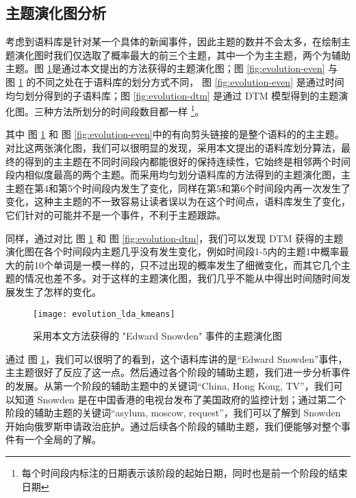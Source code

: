 \subsection{主题演化图分析}
\label{sec:evolution-map}
考虑到语料库是针对某一个具体的新闻事件，因此主题的数并不会太多，在绘制主题演化图时我们仅选取了概率最大的前三个主题，其中一个为主主题，两个为辅助主题。图 \ref{fig:evolution-our}是通过本文提出的方法获得的主题演化图；图 \ref{fig:evolution-even} 与 图 \ref{fig:evolution-our} 的不同之处在于语料库的划分方式不同， 图 \ref{fig:evolution-even}  是通过时间均匀划分得到的子语料库；图 \ref{fig:evolution-dtm} 是通过 DTM 模型得到的主题演化图。三种方法所划分的时间段数目都一样 \footnote{每个时间段内标注的日期表示该阶段的起始日期，同时也是前一个阶段的结束日期}。

其中 图 \ref{fig:evolution-our} 和 图 \ref{fig:evolution-even}中的有向剪头链接的是整个语料的的主主题。对比这两张演化图，我们可以很明显的发现，采用本文提出的语料库划分算法，最终的得到的主主题在不同时间段内都能很好的保持连续性，它始终是相邻两个时间段内相似度最高的两个主题。而采用均匀划分语料库的方法得到的主题演化图，主主题在第4和第5个时间段内发生了变化，同样在第5和第6个时间段内再一次发生了变化，这种主主题的不一致容易让读者误以为在这个时间点，语料库发生了变化，它们针对的可能并不是一个事件，不利于主题跟踪。

同样，通过对比 图 \ref{fig:evolution-our} 和 图 \ref{fig:evolution-dtm}，我们可以发现 DTM 获得的主题演化图在各个时间段内主题几乎没有发生变化，例如时间段1-5内的主题1中概率最大的前10个单词是一模一样的，只不过出现的概率发生了细微变化，而其它几个主题的情况也差不多。对于这样的主题演化图，我们几乎不能从中得出时间随时间发展发生了怎样的变化。

\begin{figure}[htb]
	\centering
	\texttt{[image: evolution\_lda\_kmeans]}
	\caption{采用本文方法获得的 "Edward Snowden" 事件的主题演化图}
	\label{fig:evolution-our}
\end{figure}

通过 图 \ref{fig:evolution-our}，我们可以很明了的看到，这个语料库讲的是“Edward Snowden”事件，主主题很好了反应了这一点。然后通过各个阶段的辅助主题，我们进一步分析事件的发展。从第一个阶段的辅助主题中的关键词“China, Hong Kong, TV”，我们可以知道 Snowden 是在中国香港的电视台发布了美国政府的监控计划；通过第二个阶段的辅助主题的关键词“asylum, moscow, request”，我们可以了解到 Snowden 开始向俄罗斯申请政治庇护。通过后续各个阶段的辅助主题，我们便能够对整个事件有一个全局的了解。

